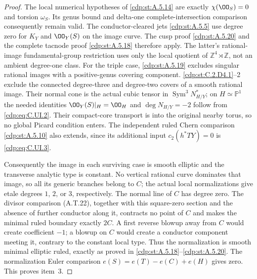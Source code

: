 \begin{proof}
The local numerical hypotheses of \ref{cdp:st:A.5.14} are
exactly $\chi(\OO_S)=0$ and torsion $\omega_S$.
Its genus bound and delta-one complete-intersection
comparison consequently remain valid. The
conductor-cleared jets \ref{cdp:st:A.5.5} use degree zero for
$K_Y$ and $\OO_Y(S)$ on the image curve.
The cusp proof \ref{cdp:st:A.5.20} and the complete tacnode
proof \ref{cdp:st:A.5.18} therefore apply. The latter's
rational-image fundamental-group restriction
uses only the local quotient of
$\mathbb Z^4\rtimes\mathbb Z$, not an ambient
degree-one class. For the triple case, \ref{cdp:st:A.5.19}
excludes singular rational images with a
positive-genus covering component. \ref{cdp:st:C.2.D4.1}--2
exclude the connected degree-three and degree-two
covers of a smooth rational image. Their normal
cone is the actual cubic tensor in
$\operatorname{Sym}^3N_{H/Y}^*$; on
$H\simeq\mathbb P^1$ the needed identities
$\OO_Y(S)|_H=\OO_H$ and $\deg N_{H/Y}=-2$
follow from \eqref{cdp:eq:C.UI.2}. Their compact-core
transport is into the original nearby torus,
so no global Picard condition enters. The
independent ruled Chern comparison \ref{cdp:st:A.5.10} also
extends, since its additional input
$c_2(h^*TY)=0$ is \eqref{cdp:eq:C.UI.3}.

Consequently the image in each surviving case
is smooth elliptic and the transverse analytic
type is constant. No vertical rational curve
dominates that image, so all its generic
branches belong to $C$; the actual local
normalizations give etale degrees $1$, $2$,
or $3$, respectively. The normal line of $C$
has degree zero. The divisor comparison
(A.T.22), together with this square-zero
section and the absence of further conductor
along it, contracts no point of $C$ and makes
the minimal ruled boundary exactly $2C$.
A first reverse blowup away from $C$ would
create coefficient $-1$; a blowup on $C$
would create a conductor component meeting
it, contrary to the constant local type.
Thus the normalization is smooth minimal
elliptic ruled, exactly as proved in
\ref{cdp:st:A.5.18}--\ref{cdp:st:A.5.20}. The normalization Euler
comparison $e(S)=e(T)-e(C)+e(H)$ gives zero.
This proves item~3.


\end{proof}
